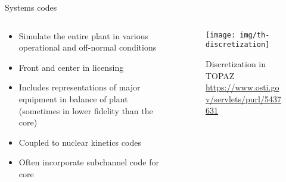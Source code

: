 \documentclass[pdf,aspectratio=169]{beamer}
\begin{document}
\begin{frame}{Systems codes}
\begin{columns}
    \begin{column}{0.7\textwidth}
    \begin{itemize}
        \item Simulate the entire plant in various operational and off-normal conditions
        \item Front and center in licensing
        \item Includes representations of major equipment in balance of plant
            (sometimes in lower fidelity than the core)
        \item Coupled to nuclear kinetics codes
        \item Often incorporate subchannel code for core
    \end{itemize}
    \end{column}
    \begin{column}{0.3\textwidth}
        \begin{figure}[ht]
        \centering
            \texttt{[image: img/th-discretization]}
            \caption{\tiny Discretization in TOPAZ
            \url{https://www.osti.gov/servlets/purl/5437631}}
        \end{figure}
    \end{column}
\end{columns}
\end{frame}
\end{document}
